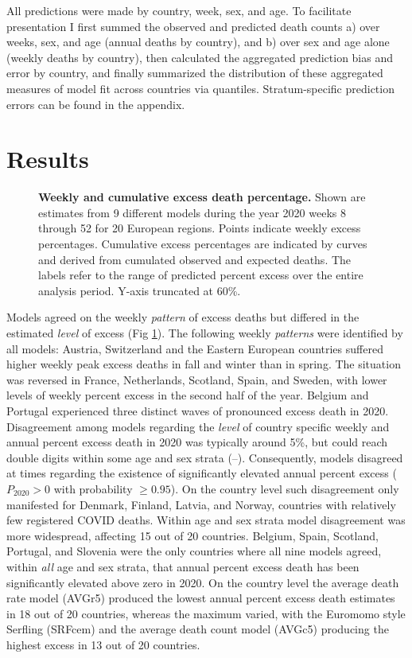 \documentclass[10pt,letterpaper]{article}
\begin{document}
All predictions were made by country, week, sex, and age. To facilitate presentation I first summed the observed and predicted death counts a) over weeks, sex, and age (annual deaths by country), and b) over sex and age alone (weekly deaths by country), then calculated the aggregated prediction bias and error by country, and finally summarized the distribution of these aggregated measures of model fit across countries via quantiles. Stratum-specific prediction errors can be found in the appendix.

\section*{Results}


\begin{figure}[!ht]
  \caption{{\bf Weekly and cumulative excess death percentage.} Shown are estimates from 9 different models during the year 2020 weeks 8 through 52 for 20 European regions. Points indicate weekly excess percentages. Cumulative excess percentages are indicated by curves and derived from cumulated observed and expected deaths. The labels refer to the range of predicted percent excess over the entire analysis period. Y-axis truncated at 60\%.}
  \label{Fig1}
\end{figure}

Models agreed on the weekly \emph{pattern} of excess deaths but differed in the estimated \emph{level} of excess (Fig \ref{Fig1}). The following weekly \emph{patterns} were identified by all models: Austria, Switzerland and the Eastern European countries suffered higher weekly peak excess deaths in fall and winter than in spring. The situation was reversed in France, Netherlands, Scotland, Spain, and Sweden, with lower levels of weekly percent excess in the second half of the year. Belgium and Portugal experienced three distinct waves of pronounced excess death in 2020. Disagreement among models regarding the \emph{level} of country specific weekly and annual percent excess death in 2020 was typically around 5\%, but could reach double digits within some age and sex strata (--). Consequently, models disagreed at times regarding the existence of significantly elevated annual percent excess ($P_{2020}>0$ with probability $\geq 0.95$). On the country level such disagreement only manifested for Denmark, Finland, Latvia, and Norway, countries with relatively few registered COVID deaths. Within age and sex strata model disagreement was more widespread, affecting 15 out of 20 countries. Belgium, Spain, Scotland, Portugal, and Slovenia were the only countries where all nine models agreed, within \emph{all} age and sex strata, that annual percent excess death has been significantly elevated above zero in 2020. On the country level the average death rate model (AVGr5) produced the lowest annual percent excess death estimates in 18 out of 20 countries, whereas the maximum varied, with the Euromomo style Serfling (SRFcem) and the average death count model (AVGc5) producing the highest excess in 13 out of 20 countries.
\end{document}
